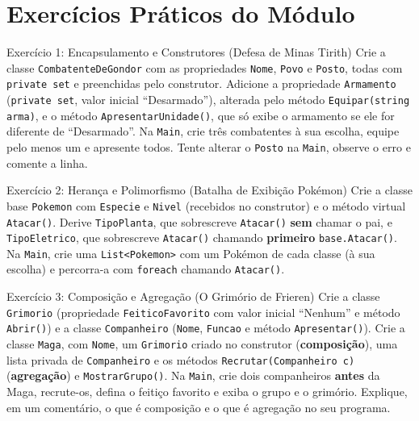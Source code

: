 \section{Exercícios Práticos do Módulo}

\begin{exercicio}{Exercício 1: Encapsulamento e Construtores (Defesa de Minas Tirith)}
Crie a classe \texttt{CombatenteDeGondor} com as propriedades \texttt{Nome}, \texttt{Povo} e
\texttt{Posto}, todas com \texttt{private set} e preenchidas pelo construtor. Adicione a
propriedade \texttt{Armamento} (\texttt{private set}, valor inicial ``Desarmado''), alterada
pelo método \texttt{Equipar(string arma)}, e o método \texttt{ApresentarUnidade()}, que só exibe
o armamento se ele for diferente de ``Desarmado''. Na \texttt{Main}, crie três combatentes à sua
escolha, equipe pelo menos um e apresente todos. Tente alterar o \texttt{Posto} na
\texttt{Main}, observe o erro e comente a linha.
\end{exercicio}

\begin{exercicio}{Exercício 2: Herança e Polimorfismo (Batalha de Exibição Pokémon)}
Crie a classe base \texttt{Pokemon} com \texttt{Especie} e \texttt{Nivel} (recebidos no
construtor) e o método virtual \texttt{Atacar()}. Derive \texttt{TipoPlanta}, que sobrescreve
\texttt{Atacar()} \textbf{sem} chamar o pai, e \texttt{TipoEletrico}, que sobrescreve
\texttt{Atacar()} chamando \textbf{primeiro} \texttt{base.Atacar()}. Na \texttt{Main}, crie uma
\texttt{List<Pokemon>} com um Pokémon de cada classe (à sua escolha) e percorra-a com
\texttt{foreach} chamando \texttt{Atacar()}.
\end{exercicio}

\begin{exercicio}{Exercício 3: Composição e Agregação (O Grimório de Frieren)}
Crie a classe \texttt{Grimorio} (propriedade \texttt{FeiticoFavorito} com valor inicial
``Nenhum'' e método \texttt{Abrir()}) e a classe \texttt{Companheiro} (\texttt{Nome},
\texttt{Funcao} e método \texttt{Apresentar()}). Crie a classe \texttt{Maga}, com \texttt{Nome},
um \texttt{Grimorio} criado no construtor (\textbf{composição}), uma lista privada de
\texttt{Companheiro} e os métodos \texttt{Recrutar(Companheiro c)} (\textbf{agregação}) e
\texttt{MostrarGrupo()}. Na \texttt{Main}, crie dois companheiros \textbf{antes} da Maga,
recrute-os, defina o feitiço favorito e exiba o grupo e o grimório. Explique, em um comentário,
o que é composição e o que é agregação no seu programa.
\end{exercicio}

